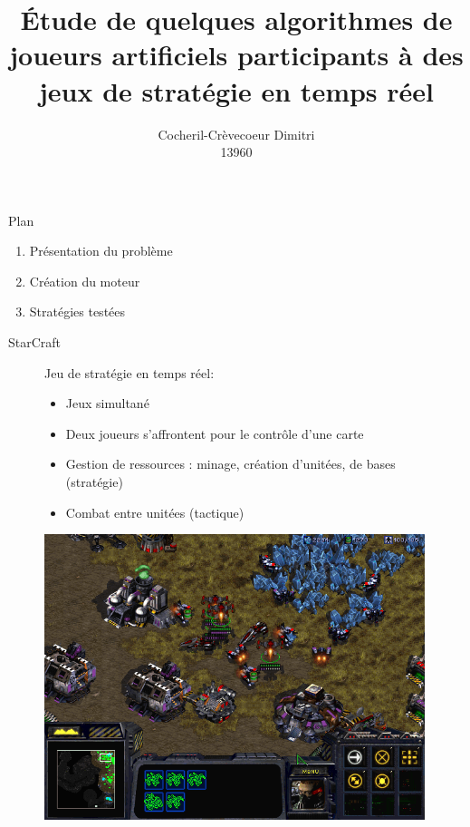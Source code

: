 \documentclass[french]{beamer}
\title{Étude de quelques algorithmes de joueurs artificiels participants à des jeux de stratégie en temps réel}
\author{Cocheril-Crèvecoeur Dimitri\\13960}
\begin{document}
\begin{frame}[plain]
    \maketitle
\end{frame}
\begin{frame}{Plan}
	\begin{enumerate}
		\item Présentation du problème
		\item Création du moteur
		\item Stratégies testées
	\end{enumerate}
\end{frame}
\begin{frame}{StarCraft}
	\begin{figure}
		\centering
		\begin{minipage}{0.5\textwidth}
			Jeu de stratégie en temps réel:
			\begin{itemize}
				\item Jeux simultané
				\item Deux joueurs s'affrontent pour le contrôle d'une carte
				\item Gestion de ressources : minage, création d'unitées, de bases (stratégie)
				\item Combat entre unitées (tactique)
			\end{itemize}
		\end{minipage}\hfill
		\begin{minipage}{0.5\textwidth}
			\centering
			\includegraphics[width=0.99\textwidth]{screen_starcraft.png}
		\end{minipage}
	\end{figure}
\end{frame}
\end{document}
